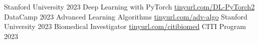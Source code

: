 \begin{cvhonors}
{   }
   {Stanford University}      %
   {2023}    %
\cvhonor
   {Deep Learning with PyTorch}    %
   {
        \hfill
        \href{https://www.datacamp.com/statement-of-accomplishment/course/432e350924c6a7474e5202570621ebc6e19155ed}{tinyurl.com/DL-PyTorch2}
        \hspace{\mystr}
   }
   {DataCamp}      %
   {2023}    %
\cvhonor
   {Advanced Learning Algorithms}    %
   {
        \hfill
        \href{https://coursera.org/verify/FKVKJHSWHHTA}{tinyurl.com/adv-algo}
        \hspace{\mystr}
   }
   {Stanford University}      %
   {2023}    %
\cvhonor
   {Biomedical Investigator}    %
   {
        \hfill
        \href{https://www.citiprogram.org/verify/?wcff7d1e2-7985-4cf3-bcf4-9d18a99ac9c8-55658490}{tinyurl.com/citibiomed}
        \hspace{\mystr}
   }
   {CITI Program}      %
   {2023}    %

\end{cvhonors}
